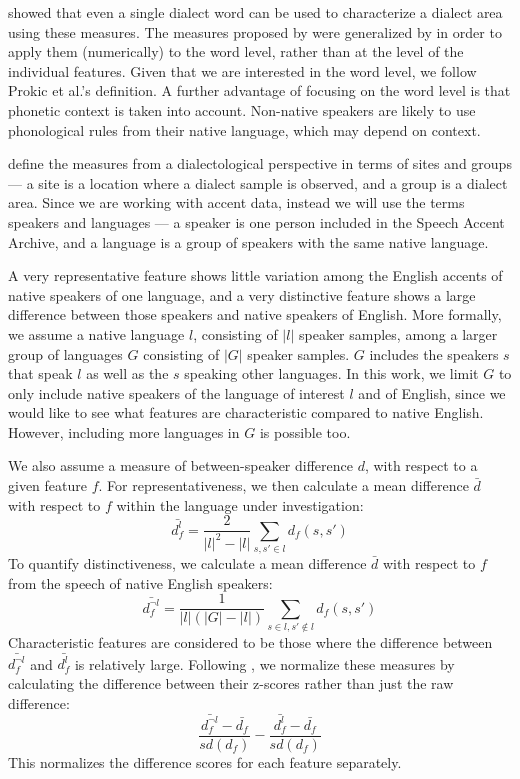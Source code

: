 \documentclass[output=paper]{LSP/langsci}
\begin{document}
\citet{prokic_detecting_2012} showed that even a single dialect word can be used to characterize a dialect area using these measures. The measures proposed by \citet{wieling_bipartite_2011} were generalized by \citet{prokic_detecting_2012} in order to apply them (numerically) to the word level, rather than at the level of the individual features. Given that we are interested in the word level, we follow Prokic et al.'s definition. A further advantage of focusing on the word level is that phonetic context is taken into account. Non-native speakers are likely to use phonological rules from their native language, which may depend on context.

\citet{prokic_detecting_2012} define the measures from a dialectological perspective in terms of sites and groups --- a site is a location where a dialect sample is observed, and a group is a dialect area. Since we are working with accent data, instead we will use the terms speakers and languages --- a speaker is one person included in the Speech Accent Archive, and a language is a group of speakers with the same native language.

A very representative feature shows little variation among the English accents of native speakers of one language, and a very distinctive feature shows a large difference between those speakers and native speakers of English. More formally, we assume a native language $l$, consisting of $|l|$ speaker samples, among a larger group of languages $G$ consisting of $|G|$ speaker samples. $G$ includes the speakers $s$ that speak $l$ as well as the $s$ speaking other languages. In this work, we limit $G$ to only include native speakers of the language of interest $l$ and of English, since we would like to see what features are characteristic compared to native English. However, including more languages in $G$ is possible too.

We also assume a measure of between-speaker difference $d$, with respect to a given feature $f$. For representativeness, we then calculate a mean difference $\bar{d}$ with respect to $f$ within the language under investigation:
\begin{equation}
\bar{d^l_f} = \frac{2}{|l|^2 - |l|} \sum_{s,s' \in l} d_f(s,s')
\end{equation}
To quantify distinctiveness, we calculate a mean difference $\bar{d}$ with respect to $f$ from the speech of native English speakers:
\begin{equation}
\bar{d^{\neg l}_f} = \frac{1}{|l|(|G| - |l|)} \sum_{s \in l,s' \notin l} d_f(s,s')
\end{equation}
Characteristic features are considered to be those where the difference between $\bar{d^{\neg l}_f}$ and $\bar{d^l_f}$ is relatively large. Following \citet{prokic_detecting_2012}, we normalize these measures by calculating the difference between their z-scores rather than just the raw difference:
\begin{equation}
\frac{\bar{d^{\neg l}_f} - \bar{d_f}}{sd(d_f)} - \frac{\bar{d^{l}_f} - \bar{d_f}}{sd(d_f)}
\end{equation}
This normalizes the difference scores for each feature separately.
\end{document}
